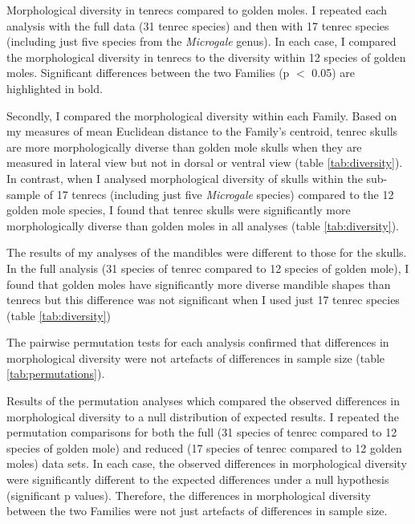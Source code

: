 	\begin{table}[!htbp]			
		\caption[Comparison of morphological diversity in tenrecs and golden moles.]
		{Morphological diversity in tenrecs compared to golden moles. I repeated each analysis with the full data (31 tenrec species) and then with 17 tenrec species (including just five species from the \textit{Microgale} genus). In each case, I compared the morphological diversity in tenrecs to the diversity within 12 species of golden moles. Significant differences between the two Families (p $<$ 0.05) are highlighted in bold.}
		 
		\label{tab:diversity}  
	\end{table}

	Secondly, I compared the morphological diversity within each Family. Based on my measures of mean Euclidean distance to the Family's centroid, tenrec skulls are more morphologically diverse than golden mole skulls when they are measured in lateral view but not in dorsal or ventral view (table \ref{tab:diversity}). In contrast, when I analysed morphological diversity of skulls within the sub-sample of 17 tenrecs (including just five \textit{Microgale} species) compared to the 12 golden mole species, I found that tenrec skulls were significantly more morphologically diverse than golden moles in all analyses (table \ref{tab:diversity}).
		
	The results of my analyses of the mandibles were different to those for the skulls. In the full analysis (31 species of tenrec compared to 12 species of golden mole), I found that golden moles have significantly more diverse mandible shapes than tenrecs but this difference was not significant when I used just 17 tenrec species (table \ref{tab:diversity})
	

	The pairwise permutation tests for each analysis confirmed that differences in morphological diversity were not artefacts of differences in sample size (table \ref{tab:permutations}).
	
\begin{table}[!htbp]			
	\caption[Results of the permutation tests]{Results of the permutation analyses which compared the observed differences in morphological diversity to a null distribution of expected results. I repeated the permutation comparisons for both the full (31 species of tenrec compared to 12 species of golden mole) and reduced (17 species of tenrec compared to 12 golden moles) data sets. In each case, the observed differences in morphological diversity were significantly different to the expected differences under a null hypothesis (significant p values). Therefore, the differences in morphological diversity between the two Families were not just artefacts of differences in sample size.}
	 
	\label{tab:permutations}  
\end{table}
	
